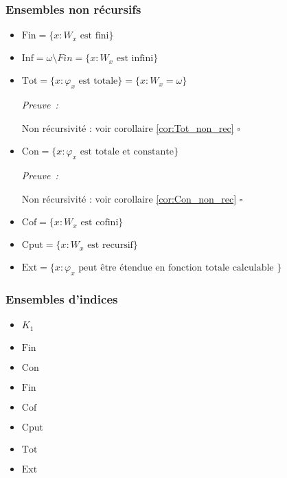 \documentclass{book}
\theoremstyle{definition}
\numberwithin{lemma}{subsection}
\numberwithin{theorem}{subsection}
\numberwithin{definition}{subsection}
\numberwithin{proposition}{subsection}
\numberwithin{corollary}{subsection}
\numberwithin{property}{subsection}
\numberwithin{example}{subsection}
\numberwithin{heuristique}{subsection}
\numberwithin{scenario}{subsection}
\newenvironment{proofi} {\noindent\emph{Preuve~:}} {\hfill $\square$\vspace{0.2cm}}
\newcommand{\GodelFunc}[1]{\varphi_{#1}}
\newcommand{\EnsFin}{\mathrm{Fin}}
\newcommand{\EnsInf}{\mathrm{Inf}}
\newcommand{\EnsTot}{\mathrm{Tot}}
\newcommand{\EnsCon}{\mathrm{Con}}
\newcommand{\EnsCof}{\mathrm{Cof}}
\newcommand{\EnsCput}{\mathrm{Cput}}
\newcommand{\EnsExt}{\mathrm{Ext}}
\begin{document}
        \subsubsection{Ensembles non récursifs}
            \begin{itemize}
                \item $\EnsFin = \{x:W_x\text{ est fini}\}$
                \item $\EnsInf = \omega \setminus Fin = \{x:W_x\text{ est infini}\}$
                \item $\EnsTot = \{x:\GodelFunc{x}\text{ est totale}\} = \{x:W_x = \omega \}$
                    \par\begin{proofi}
                        \par Non récursivité : voir corollaire \ref{cor:Tot_non_rec}
                    \end{proofi}
                \item $\EnsCon = \{x:\GodelFunc{x}\text{ est totale et constante}\}$
                    \par\begin{proofi}
                        \par Non récursivité : voir corollaire \ref{cor:Con_non_rec}
                    \end{proofi}
                \item $\EnsCof = \{x:W_x\text{ est cofini}\}$
                \item $\EnsCput = \{x:W_x\text{ est recursif}\}$
                \item $\EnsExt = \{x : \GodelFunc{x} \mbox{~peut être étendue en fonction totale calculable~}\}$
            \end{itemize}
            
            \subsubsection{Ensembles d'indices}
            \begin{itemize}
                \item $K_1$
                \item $\EnsFin$
                \item $\EnsCon$
                \item $\EnsFin$
                \item $\EnsCof$
                \item $\EnsCput$
                \item $\EnsTot$
                \item $\EnsExt$
            \end{itemize}
            
\end{document}
